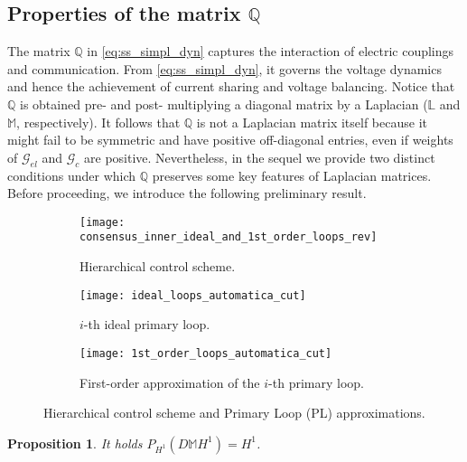 \documentclass[a4paper]{article}
\theoremstyle{plain}
\newtheorem{prp}{Proposition}
\begin{document}
\subsection{Properties of the matrix $\mathbb{Q}$}
\label{sec:properties_Q}
The matrix $\mathbb{Q}$ in \eqref{eq:ss_simpl_dyn} captures the interaction of electric couplings and communication. From \eqref{eq:ss_simpl_dyn}, it governs the voltage dynamics and hence the achievement of current sharing and voltage balancing.
Notice that $\mathbb{Q}$ is obtained  pre- and post- multiplying a diagonal matrix by a Laplacian ($\mathbb{L}$ and $\mathbb{M}$, respectively). It follows that $\mathbb{Q}$ is not a Laplacian matrix itself because it might fail to be symmetric and have
positive off-diagonal entries, even if weights of $\mathcal{G}_{el}$ and $\mathcal{G}_{c}$
are positive. Nevertheless, in the sequel we provide two distinct conditions under which $\mathbb{Q}$ preserves some key features of Laplacian matrices. Before proceeding, we introduce the following preliminary result.
\begin{figure}[!htb]
	\centering
	\begin{subfigure}[!htb]{0.8\textwidth}
		\centering
		\texttt{[image: consensus\_inner\_ideal\_and\_1st\_order\_loops\_rev]}
		\caption{Hierarchical control scheme.}
		\label{fig:hierarc}
	\end{subfigure}
	\begin{subfigure}[!htb]{0.35\columnwidth}
		\centering
		\texttt{[image: ideal\_loops\_automatica\_cut]}
		\caption{$i$-th ideal primary loop.}
		\label{fig:ith_ideal}
	\end{subfigure}
	\begin{subfigure}[!htb]{0.45\columnwidth}
		\centering
		\texttt{[image: 1st\_order\_loops\_automatica\_cut]}
		\caption{First-order approximation of the $i$-th primary loop.}
		\label{ith_first_order}
	\end{subfigure}
	\caption{Hierarchical control scheme and
		Primary Loop (PL) approximations.}
	\label{fig:hierarc_scheme}
\end{figure}
\begin{prp}
	\label{prp:projection}
	It holds $P_{H^1}(D\mathbb{M} H^1) = H^1$.
\end{prp}
\end{document}
